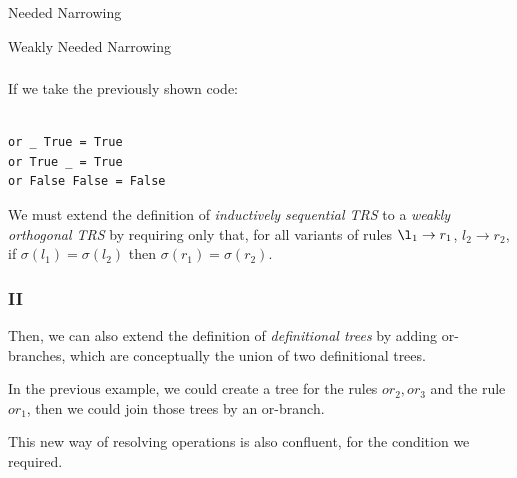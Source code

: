 \documentclass{beamer}
\begin{document}
\begin{section}{Needed Narrowing}
\begin{subsection}{Weakly Needed Narrowing}

\begin{frame}[fragile]
\frametitle{\subsecname}
  If we take the previously shown code:
\begin{verbatim}

or _ True = True
or True _ = True
or False False = False

\end{verbatim}

 We must extend the definition of \textit{inductively sequential TRS} to a \textit{weakly orthogonal TRS} by requiring only that, for all variants of rules $\l_1 \rightarrow r_1$, $l_2 \rightarrow r_2$, if $\sigma(l_1) = \sigma(l_2)$ then $\sigma(r_1) = \sigma(r_2)$.

\end{frame}

\begin{frame}
\frametitle{{\subsecname} II}
  Then, we can also extend the definition of \textit{definitional trees} by adding or-branches, which are conceptually the union of two definitional trees.

  In the previous example, we could create a tree for the rules {$or_2,or_3$} and the rule {$or_1$}, then we could join those trees by an or-branch.

  This new way of resolving operations is also confluent, for the condition we required.

  \end{frame}
\end{subsection}
\end{section}
\end{document}

